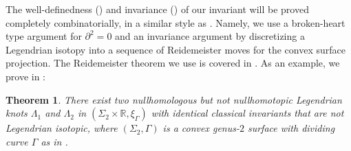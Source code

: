 \documentclass[11pt]{amsart}
\theoremstyle{mystyle}
\newtheorem{theorem}[theorem]{Theorem}
\newcommand{\R}{\mathbb{R}}
\newcommand{\<}{\langle}
\renewcommand{\>}{\rangle}
\begin{document}
The well-definedness () and invariance () of our invariant will be proved completely combinatorially, in a similar style as \cite{chekanov2002dga}. Namely, we use a broken-heart type argument for $\partial^2 = 0$ and an invariance argument by discretizing a Legendrian isotopy into a sequence of Reidemeister moves for the convex surface projection. The Reidemeister theorem we use is covered in . As an example, we prove in :

\begin{theorem}\label{thm: main 2} \it
    There exist two nullhomologous but not nullhomotopic Legendrian knots $\Lambda_1$ and $\Lambda_2$ in $(\Sigma_2\times \R, \xi_\Gamma)$ with identical classical invariants that are not Legendrian isotopic, where $(\Sigma_2, \Gamma)$ is a convex genus-$2$ surface with dividing curve $\Gamma$ as in .
\end{theorem}
\end{document}
